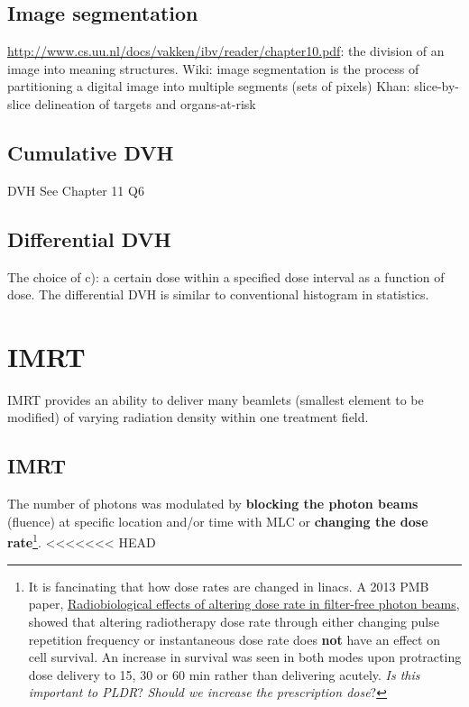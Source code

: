 \documentclass[]{book}
\let\rmarkdownfootnote\footnote%
\def\footnote{\protect\rmarkdownfootnote}
\theoremstyle{definition}
\theoremstyle{definition}
\theoremstyle{definition}
\theoremstyle{remark}
\begin{document}
\section{Image segmentation}\label{image-segmentation}

\url{http://www.cs.uu.nl/docs/vakken/ibv/reader/chapter10.pdf}: the
division of an image into meaning structures. Wiki: image segmentation
is the process of partitioning a digital image into multiple segments
(sets of pixels) Khan: slice-by-slice delineation of targets and
organs-at-risk

\section{Cumulative DVH}\label{cumulative-dvh}

DVH See Chapter 11 Q6

\section{Differential DVH}\label{differential-dvh}

The choice of c): a certain dose within a specified dose interval as a
function of dose. The differential DVH is similar to conventional
histogram in statistics.

\chapter{IMRT}\label{imrt}

IMRT provides an ability to deliver many beamlets (smallest element to
be modified) of varying radiation density within one treatment field.

\section{IMRT}\label{imrt}

The number of photons was modulated by \textbf{blocking the photon
beams} (fluence) at specific location and/or time with MLC or
\textbf{changing the dose rate}\footnote{It is fancinating that how dose
  rates are changed in linacs. A 2013 PMB paper,
  \href{http://iopscience.iop.org/article/10.1088/0031-9155/58/4/1075/meta}{Radiobiological
  effects of altering dose rate in filter-free photon beams}, showed
  that altering radiotherapy dose rate through either changing pulse
  repetition frequency or instantaneous dose rate does \textbf{not} have
  an effect on cell survival. An increase in survival was seen in both
  modes upon protracting dose delivery to 15, 30 or 60 min rather than
  delivering acutely. \emph{Is this important to PLDR}? \emph{Should we
  increase the prescription dose}?}.
<<<<<<< HEAD
\end{document}
